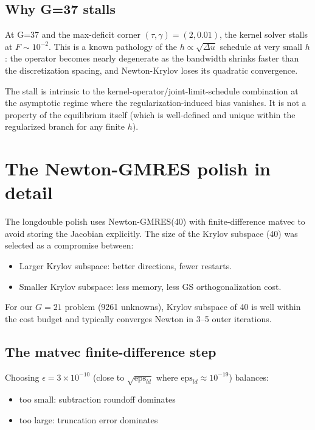 \documentclass[11pt]{article}
\newcommand{\1}{\mathbf{1}}
\begin{document}
\subsection{Why G=37 stalls}

At G=37 and the max-deficit corner $(\tau, \gamma) = (2, 0.01)$, the
kernel solver stalls at $F \sim 10^{-2}$.  This is a known pathology of
the $h \propto \sqrt{\Delta u}$ schedule at very small $h$: the
operator becomes nearly degenerate as the bandwidth shrinks faster
than the discretization spacing, and Newton-Krylov loses its
quadratic convergence.

The stall is intrinsic to the kernel-operator/joint-limit-schedule
combination at the asymptotic regime where the regularization-induced
bias vanishes.  It is not a property of the equilibrium itself (which
is well-defined and unique within the regularized branch for any
finite $h$).

\section{The Newton-GMRES polish in detail}

The longdouble polish uses Newton-GMRES(40) with finite-difference
matvec to avoid storing the Jacobian explicitly.  The size of the
Krylov subspace (40) was selected as a compromise between:

\begin{itemize}
\item Larger Krylov subspace: better directions, fewer restarts.
\item Smaller Krylov subspace: less memory, less GS orthogonalization cost.
\end{itemize}

For our $G=21$ problem (9261 unknowns), Krylov subspace of 40 is well
within the cost budget and typically converges Newton in 3--5 outer
iterations.

\subsection{The matvec finite-difference step}

Choosing $\epsilon = 3 \times 10^{-10}$ (close to $\sqrt{\mathrm{eps}_{ld}}$
where $\mathrm{eps}_{ld} \approx 10^{-19}$) balances:
\begin{itemize}
\item too small: subtraction roundoff dominates
\item too large: truncation error dominates
\end{itemize}
\end{document}

